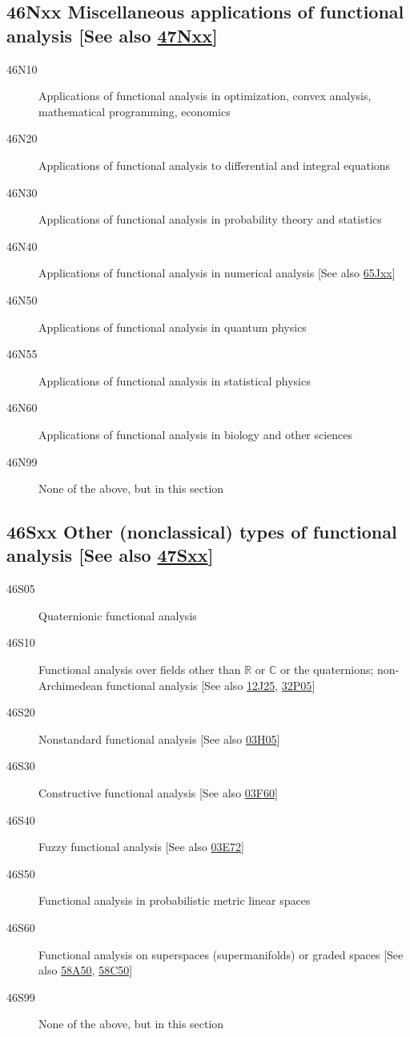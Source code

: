 \subsection*{46Nxx  Miscellaneous applications of functional analysis [See also \hyperref[47Nxx]{47Nxx}] }\label{46Nxx}
\begin{description}  
\item [46N10]\label{46N10} Applications of functional analysis in optimization, convex analysis, mathematical programming, economics
\item [46N20]\label{46N20} Applications of functional analysis to differential and integral equations
\item [46N30]\label{46N30} Applications of functional analysis in probability theory and statistics
\item [46N40]\label{46N40} Applications of functional analysis in numerical analysis [See also \hyperref[65Jxx]{65Jxx}]
\item [46N50]\label{46N50} Applications of functional analysis in quantum physics
\item [46N55]\label{46N55} Applications of functional analysis in statistical physics
\item [46N60]\label{46N60} Applications of functional analysis in biology and other sciences
\item [46N99]\label{46N99} None of the above, but in this section
\end{description}
\subsection*{46Sxx  Other (nonclassical) types of functional analysis [See also \hyperref[47Sxx]{47Sxx}] }\label{46Sxx}
\begin{description}  
\item [46S05]\label{46S05} Quaternionic functional analysis
\item [46S10]\label{46S10} Functional analysis over fields other than $\mathbb{R}$ or $\mathbb{C}$ or the quaternions; non-Archimedean functional analysis [See also \hyperref[12J25]{12J25}, \hyperref[32P05]{32P05}]
\item [46S20]\label{46S20} Nonstandard functional analysis [See also \hyperref[03H05]{03H05}]
\item [46S30]\label{46S30} Constructive functional analysis [See also \hyperref[03F60]{03F60}]
\item [46S40]\label{46S40} Fuzzy functional analysis [See also \hyperref[03E72]{03E72}]
\item [46S50]\label{46S50} Functional analysis in probabilistic metric linear spaces
\item [46S60]\label{46S60} Functional analysis on superspaces (supermanifolds) or graded spaces [See also \hyperref[58A50]{58A50}, \hyperref[58C50]{58C50}]
\item [46S99]\label{46S99} None of the above, but in this section
\end{description}
